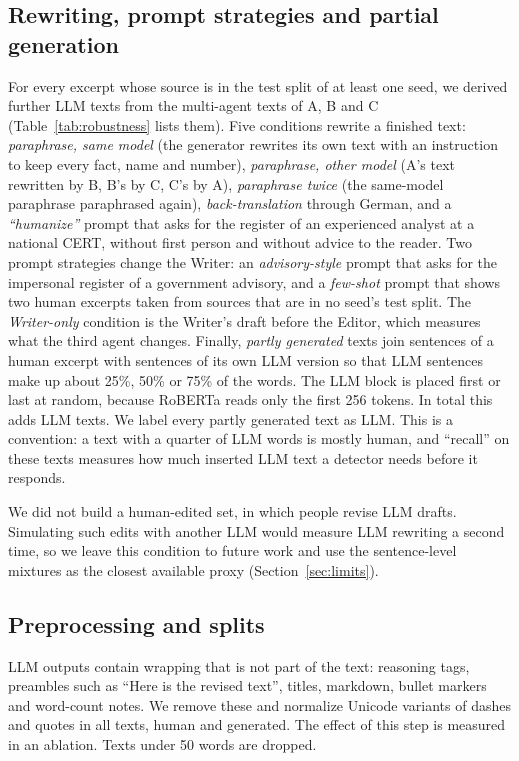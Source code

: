 \documentclass[journal]{IEEEtran}
\begin{document}
\subsection{Rewriting, prompt strategies and partial generation}
For every excerpt whose source is in the test split of at least one seed, we derived further LLM texts from the
multi-agent texts of A, B and C (Table~\ref{tab:robustness} lists them). Five conditions rewrite a finished text:
\emph{paraphrase, same model} (the generator rewrites its own text with an instruction to keep every fact, name and
number), \emph{paraphrase, other model} (A's text rewritten by B, B's by C, C's by A), \emph{paraphrase twice} (the
same-model paraphrase paraphrased again), \emph{back-translation} through German, and a \emph{``humanize''} prompt
that asks for the register of an experienced analyst at a national CERT, without first person and without advice
to the reader. Two prompt strategies change the Writer: an \emph{advisory-style} prompt that asks for the
impersonal register of a government advisory, and a \emph{few-shot} prompt that shows two human excerpts taken from
sources that are in no seed's test split. The \emph{Writer-only} condition is the Writer's draft before the Editor,
which measures what the third agent changes. Finally, \emph{partly generated} texts join sentences of a human
excerpt with sentences of its own LLM version so that LLM sentences make up about 25\%, 50\% or 75\% of the words.
The LLM block is placed first or last at random, because RoBERTa reads only the first 256 tokens. In total this
adds \NVarTexts{} LLM texts. We label every partly generated text as LLM. This is a convention: a text with a
quarter of LLM words is mostly human, and ``recall'' on these texts measures how much inserted LLM text a detector
needs before it responds.

We did not build a human-edited set, in which people revise LLM drafts. Simulating such edits with another LLM
would measure LLM rewriting a second time, so we leave this condition to future work and use the sentence-level
mixtures as the closest available proxy (Section~\ref{sec:limits}).

\subsection{Preprocessing and splits}
LLM outputs contain wrapping that is not part of the text: reasoning tags, preambles such as ``Here is the revised
text'', titles, markdown, bullet markers and word-count notes. We remove these and normalize Unicode variants of
dashes and quotes in all texts, human and generated. The effect of this step is measured in an ablation. Texts
under 50 words are dropped.
\end{document}
